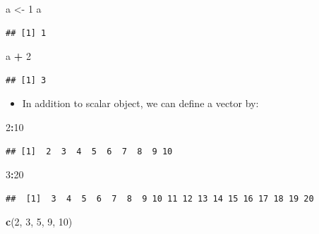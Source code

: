 \documentclass[]{book}
\newenvironment{Shaded}{\begin{snugshade}}{\end{snugshade}}
\newcommand{\KeywordTok}[1]{\textcolor[rgb]{0.13,0.29,0.53}{\textbf{#1}}}
\newcommand{\DecValTok}[1]{\textcolor[rgb]{0.00,0.00,0.81}{#1}}
\newcommand{\StringTok}[1]{\textcolor[rgb]{0.31,0.60,0.02}{#1}}
\newcommand{\OperatorTok}[1]{\textcolor[rgb]{0.81,0.36,0.00}{\textbf{#1}}}
\newcommand{\NormalTok}[1]{#1}
\providecommand{\tightlist}{%
  \setlength{\itemsep}{0pt}\setlength{\parskip}{0pt}}
\theoremstyle{definition}
\theoremstyle{definition}
\theoremstyle{definition}
\theoremstyle{remark}
\begin{document}
\begin{Shaded}
\begin{Highlighting}[]
\NormalTok{a <-}\StringTok{ }\DecValTok{1}
\NormalTok{a}
\end{Highlighting}
\end{Shaded}

\begin{verbatim}
## [1] 1
\end{verbatim}

\begin{Shaded}
\begin{Highlighting}[]
\NormalTok{a }\OperatorTok{+}\StringTok{ }\DecValTok{2}
\end{Highlighting}
\end{Shaded}

\begin{verbatim}
## [1] 3
\end{verbatim}

\begin{itemize}
\tightlist
\item
  In addition to scalar object, we can define a vector by:
\end{itemize}

\begin{Shaded}
\begin{Highlighting}[]
\DecValTok{2}\OperatorTok{:}\DecValTok{10}
\end{Highlighting}
\end{Shaded}

\begin{verbatim}
## [1]  2  3  4  5  6  7  8  9 10
\end{verbatim}

\begin{Shaded}
\begin{Highlighting}[]
\DecValTok{3}\OperatorTok{:}\DecValTok{20}
\end{Highlighting}
\end{Shaded}

\begin{verbatim}
##  [1]  3  4  5  6  7  8  9 10 11 12 13 14 15 16 17 18 19 20
\end{verbatim}

\begin{Shaded}
\begin{Highlighting}[]
\KeywordTok{c}\NormalTok{(}\DecValTok{2}\NormalTok{, }\DecValTok{3}\NormalTok{, }\DecValTok{5}\NormalTok{, }\DecValTok{9}\NormalTok{, }\DecValTok{10}\NormalTok{)}
\end{Highlighting}
\end{Shaded}
\end{document}
